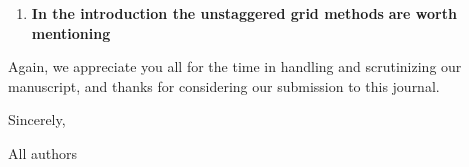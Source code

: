 \documentclass[twoside,11pt]{article}
\begin{document}
\begin{enumerate}
\item \textbf{In the introduction the unstaggered grid methods} \cite{kozdon2013simulation,duru2016dynamic} \textbf{are worth mentioning}

\end{enumerate}

Again, we appreciate you all for the time in handling and scrutinizing our manuscript, and thanks for considering our submission to this journal.

Sincerely, 

All authors



\end{document}
